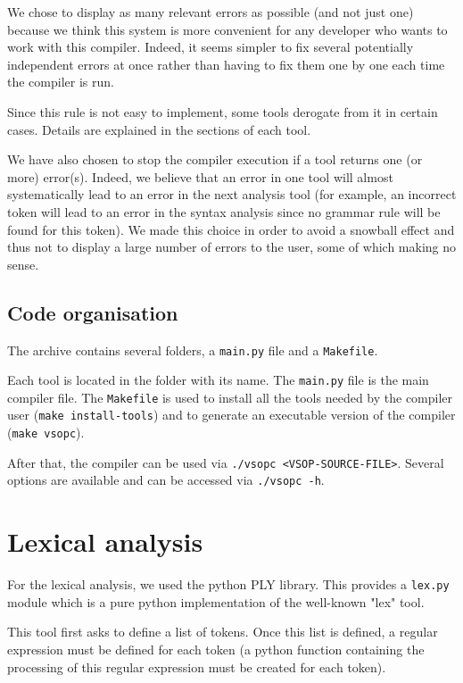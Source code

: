 \documentclass[a4paper, 12pt]{article}
\begin{document}
    We chose to display as many relevant errors as possible (and not just one) because we think this system is more convenient for any developer who wants to work with this compiler. Indeed, it seems simpler to fix several potentially independent errors at once rather than having to fix them one by one each time the compiler is run.
    
    Since this rule is not easy to implement, some tools derogate from it in certain cases. Details are explained in the sections of each tool.
    
    We have also chosen to stop the compiler execution if a tool returns one (or more) error(s). Indeed, we believe that an error in one tool will almost systematically lead to an error in the next analysis tool (for example, an incorrect token will lead to an error in the syntax analysis since no grammar rule will be found for this token). We made this choice in order to avoid a snowball effect and thus not to display a large number of errors to the user, some of which making no sense.
    
    \subsection{Code organisation}
    
    The archive contains several folders, a \texttt{main.py} file and a \texttt{Makefile}.
    
    Each tool is located in the folder with its name. The \texttt{main.py} file is the main compiler file. The \texttt{Makefile} is used to install all the tools needed by the compiler user (\texttt{make install-tools}) and to generate an executable version of the compiler (\texttt{make vsopc}).
    
    After that, the compiler can be used via \texttt{./vsopc <VSOP-SOURCE-FILE>}. Several options are available and can be accessed via \texttt{./vsopc -h}.
    
    
    \section{Lexical analysis}
    
    For the lexical analysis, we used the python PLY library. This provides a \texttt{lex.py} module which is a pure python implementation of the well-known "lex" tool.
    
    This tool first asks to define a list of tokens. Once this list is defined, a regular expression must be defined for each token (a python function containing the processing of this regular expression must be created for each token).
    
\end{document}
